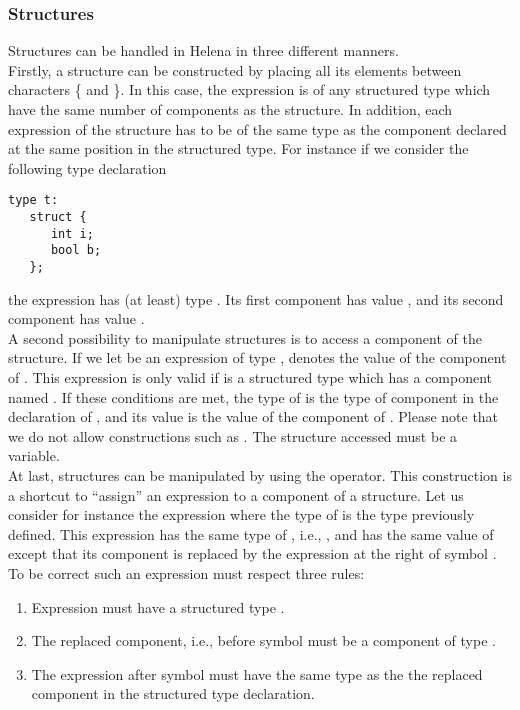 \ifthenelsedef


\subsubsection{Structures}
Structures can be handled in Helena in three different manners.\\

 Firstly,
a structure can be constructed by placing all its elements between
characters \{ and \}.  In this case, the expression is of any
structured type which have the same number of components as the
structure.  In addition, each expression of the structure has to be of
the same type as the component declared at the same position in the
structured type.  For instance if we consider the following type
declaration
\begin{lstlisting}
type t:
   struct {
      int i;
      bool b;
   };
\end{lstlisting}
the expression  has (at least) type .  Its
first component  has value , and its second component
 has value .\\

 A second
possibility to manipulate structures is to access a component of the
structure.  If we let  be an expression of type , 
denotes the value of the component  of .  This expression
is only valid if  is a structured type which has a component
named .  If these conditions are met, the type of  is
the type of component  in the declaration of , and its
value is the value of the component  of .  Please note
that we do not allow constructions such as .  The
structure accessed must be a variable.\\

 At last,
structures can be manipulated by using the \LS{::} operator.  This
construction is a shortcut to ``assign'' an expression to a component
of a structure.  Let us consider for instance the expression  where the type of  is the type 
previously defined.  This expression has the same type of ,
i.e., , and has the same value of  except that its
component  is replaced by the expression at the right of symbol
\LS{:=}.  To be correct such an expression must respect three rules:
\begin{enumerate}
\item Expression  must have a structured type .
\item The replaced component, i.e., before symbol \LS{:=} must be a
  component of type .
\item The expression after symbol \LS{:=} must have the same type as
  the the replaced component in the structured type declaration.
\end{enumerate}

